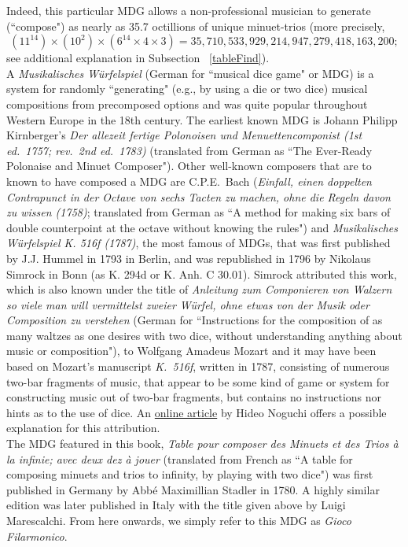 \documentclass[a4paper,x11names,svgnames,10pt]{article}
\begin{document}
{Indeed, this particular MDG allows a non-professional musician to generate (``compose") as nearly as 35.7 octillions of unique minuet-trios (more precisely, $$(11^{14})\times(10^2)\times(6^{14}\times 4\times 3) = 35,710,533,929,214,947,279,418,163,200;$$ see additional explanation in Subsection ~\ref{tableFind}).\\  

A {\it Musikalisches W\"{u}rfelspiel} (German for ``musical dice game" or MDG) is a system for randomly ``generating" (e.g., by using a die or two dice) musical compositions from precomposed options and was quite popular throughout Western Europe in the 18th century.  The earliest known MDG is Johann Philipp Kirnberger's {\em Der allezeit fertige Polonoisen und Menuettencomponist (1st ed.\ 1757; rev.\ 2nd ed.\ 1783)} (translated from German as ``The Ever-Ready Polonaise and Minuet Composer").  Other well-known composers that are to known to have composed a MDG are C.P.E.\ Bach ({\em Einfall, einen doppelten Contrapunct in der Octave von sechs Tacten zu machen, ohne die Regeln davon zu wissen (1758)}; translated from German as ``A method for making six bars of double counterpoint at the octave without knowing the rules") and {\it Musikalisches W\"{u}rfelspiel K. 516f (1787)}, the most famous of MDGs, that was first published by J.J. Hummel in 1793 in Berlin, and was republished in 1796 by Nikolaus Simrock in Bonn (as K. 294d or K. Anh. C 30.01). Simrock attributed this work, which is also known under the title of {\em Anleitung zum Componieren von Walzern so viele man will vermittelst zweier W\"{u}rfel, ohne etwas von der Musik oder Composition zu verstehen} (German for ``Instructions for the composition of as many waltzes as one desires with two dice, without understanding anything about music or composition"), to Wolfgang Amadeus Mozart and it may have been based on Mozart's manuscript {\em K.\ 516f}, written in 1787, consisting of numerous two-bar fragments of music, that appear to be some kind of game or system for constructing music out of two-bar fragments, but contains no instructions nor hints as to the use of dice.  An \href{(http://www.asahi-net.or.jp/\~rb5h-ngc/e/k516f.htm}{online article} by Hideo Noguchi offers a possible explanation for this attribution. \\

The MDG featured in this book, {\em Table pour composer des Minuets et des Trios \`{a} la infinie; avec deux dez \`{a} jouer} (translated from French as  ``A table for composing minuets and trios to infinity, by playing with two dice") was first published in Germany by Abb\'{e} Maximillian Stadler in 1780. A highly similar edition was later published in Italy with the title given above by Luigi Marescalchi.  From here onwards, we simply refer to this MDG as {\em Gioco Filarmonico}.  \\

}
\end{document}
